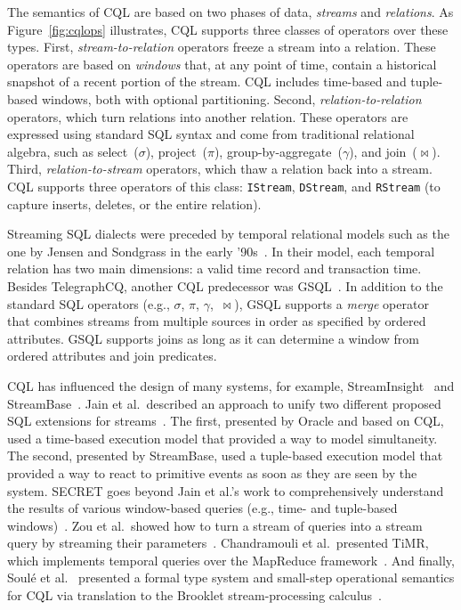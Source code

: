 The semantics of CQL are
based on two phases of data, \emph{streams} and \emph{relations}.
As Figure~\ref{fig:cqlops} illustrates, CQL
supports three classes of operators over these types. First,
\emph{stream-to-relation} operators freeze a stream into a relation.
These operators are based on
\emph{windows} that, at any point of time, contain a
historical snapshot of a recent portion of the stream. CQL includes
time-based and tuple-based windows, both with optional
partitioning. Second, \emph{relation-to-relation} operators, which
turn relations into another relation. These operators are expressed
using standard SQL syntax and come from traditional relational
algebra, such as select~($\sigma$), project~($\pi$),
group-by-aggregate~($\gamma$), and join~($\bowtie$).
Third, \emph{rela\-tion-to-stream} operators, which thaw a relation
back into a stream. CQL supports three operators of this class:
\texttt{IStream}, \texttt{DStream}, and \texttt{RStream} (to capture inserts, deletes, or the entire
relation).

Streaming SQL dialects were preceded by temporal relational models
such as the one by Jensen and Sondgrass in the early
'90s~\cite{jensen1994temporal}. In their model, each temporal relation
has two main dimensions: a valid time record and transaction time.
Besides TelegraphCQ, another CQL predecessor was
\textsf{GSQL}~\cite{cranor_et_al_2003}.  In addition to the standard SQL
operators (e.g., $\sigma$, $\pi$, $\gamma$,~$\bowtie$), GSQL supports
a \emph{merge} operator that combines streams from multiple sources in
order as specified by ordered attributes.  GSQL supports joins as long
as it can determine a window from ordered attributes and join predicates.

CQL has influenced the design of many systems, for example,
\textsf{StreamInsight}~\cite{ali_et_al_2009} and
\textsf{StreamBase}~\cite{seyfer_tibbetts_mishkin_2011}.
%
Jain et al.\ described an approach to unify two different proposed SQL
extensions for streams~\cite{jain_et_al_2008}. The first, presented by
Oracle and based on CQL, used a time-based execution model that
provided a way to model simultaneity. The second, presented by
\textsf{StreamBase}, used a tuple-based execution model that provided
a way to react to primitive events as soon as they are seen by the
system.
%
\textsf{SECRET} goes beyond Jain et al.'s work to comprehensively
understand the results of various window-based queries (e.g., time-
and tuple-based windows)~\cite{botan_et_al_2010}.
Zou et al.\ showed how to turn a stream of queries into a stream query
by streaming their parameters~\cite{zou_et_al_2010}.
%
Chandramouli et al.\ presented \textsf{TiMR}, which implements
temporal queries over the MapReduce
framework~\cite{chandramouli2012temporal}.
%
And finally, Soul\'{e} et al.~\cite{soule_et_al_2016} presented a
formal type system and small-step operational semantics for CQL via
translation to the \textsf{Brooklet} stream-processing
calculus~\cite{soule_et_al_2010}.
